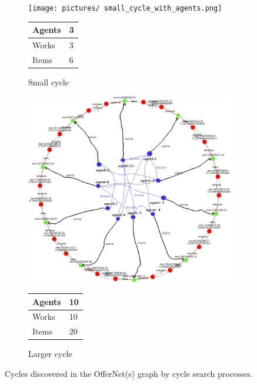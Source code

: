 \documentclass{article}
\begin{document}
\begin{figure}[H]
    \centering
    \captionsetup{justification=centering, size=scriptsize}
    \begin{subfigure}{0.45\textwidth}
      \texttt{[image: pictures/ small\_cycle\_with\_agents.png]}
      \caption{Small cycle}
      \scriptsize
      \begin{tabular}{ | L{2 cm} | L{0.5 cm} | }
      \hline
      Agents & 3  \\ \hline
      Works & 3  \\ \hline
      Items & 6  \\ \hline
      \end{tabular}
      \label{fig:cycle-small-with-agents}
    \end{subfigure}
    \quad
    \begin{subfigure}{0.38\textwidth}
      \includegraphics[width=1\textwidth]{pictures/larger_cycle_with_agents.png}
      \caption{Larger cycle}
      \scriptsize
      \begin{tabular}{ | L{2 cm} | L{0.5 cm} | }
      \hline
      Agents & 10  \\ \hline
      Works & 10  \\ \hline
      Items & 20  \\ \hline
      \end{tabular}
      \label{fig:cycle-larger-with-agents}
    \end{subfigure}
    \footnotesize
    \caption{Cycles discovered in the OfferNet(s) graph by cycle search processes.}
    \label{fig:cycle-search}
\end{figure}
\end{document}
